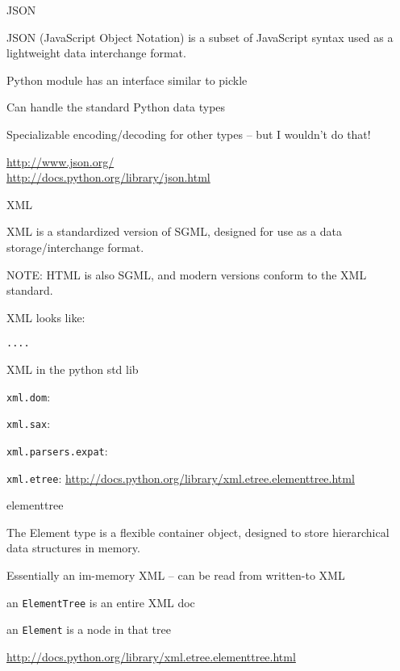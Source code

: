 \documentclass{beamer}
\begin{document}
\begin{frame}[fragile]{JSON}

\vfill
{\Large JSON (JavaScript Object Notation) is a subset of JavaScript syntax
        used as a lightweight data interchange format.}

\vfill
{\Large Python module has an interface similar to pickle}

\vfill
{\Large Can handle the standard Python data types}

\vfill
{\Large Specializable encoding/decoding for other types -- but I wouldn't do that!}


\vfill
\url{http://www.json.org/}\\
\url{http://docs.python.org/library/json.html}
\end{frame} 

\begin{frame}[fragile]{XML}

\vfill
{\Large XML is a standardized version of SGML, designed for use as a data
        storage/interchange format.}

\vfill
{\Large NOTE: HTML is also SGML, and modern versions conform to the XML standard.}

\vfill
{\Large XML looks like:}

\begin{verbatim} 
....
\end{verbatim} 

\end{frame} 

\begin{frame}[fragile]{XML in the python std lib}


\vfill
{\Large \verb|xml.dom|: }

\vfill
{\Large \verb|xml.sax|: }

\vfill
{\Large \verb|xml.parsers.expat|: }

\vfill
{\Large \verb|xml.etree|: }
\url{http://docs.python.org/library/xml.etree.elementtree.html}

\end{frame} 

\begin{frame}[fragile]{elementtree}


\vfill
{\Large  The Element type is a flexible container object, designed to store
hierarchical data structures in memory.}

\vfill
{\Large  Essentially an im-memory XML -- can be read from written-to XML}

\vfill
{\Large an \verb|ElementTree| is an entire XML doc}

\vfill
{\Large an \verb|Element| is a node in that tree}

\vfill
\url{http://docs.python.org/library/xml.etree.elementtree.html}

\end{frame} 
\end{document}
